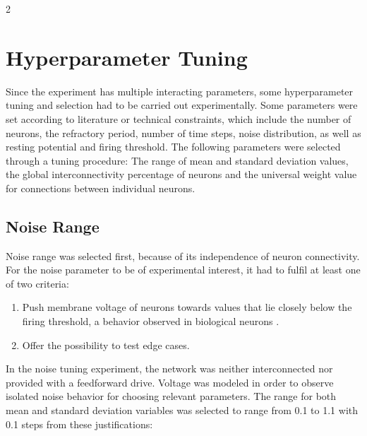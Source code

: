 \documentclass[12pt,a4paper]{article}
\begin{document}
\begin{multicols}{2}
        \section{Hyperparameter Tuning}
            Since the experiment has multiple interacting parameters, some hyperparameter tuning and selection had to be carried out experimentally. Some parameters were set according to literature or technical constraints, which include the number of neurons, the refractory period, number of time steps, noise distribution, as well as resting potential and firing threshold. The following parameters were selected through a tuning procedure: The range of mean and standard deviation values, the global interconnectivity percentage of neurons and the universal weight value for connections between individual neurons.
            
        \subsection{Noise Range} 
            Noise range was selected first, because of its independence of neuron connectivity. For the noise parameter to be of experimental interest, it had to fulfil at least one of two criteria: 
            \begin{enumerate}[label=(\arabic*), leftmargin=*, rightmargin=1em, itemsep=10pt, parsep=0pt, topsep=10pt, partopsep=0pt]
                \item\label{noise1} Push membrane voltage of neurons towards values that lie closely below the firing threshold, a behavior observed in biological neurons \cite{F}.
                \item\label{noise2} Offer the possibility to test edge cases.
            \end{enumerate}
            In the noise tuning experiment, the network was neither interconnected nor provided with a feedforward drive. Voltage was modeled in order to observe isolated noise behavior for choosing relevant parameters. The range for both mean and standard deviation variables was selected to range from 0.1 to 1.1 with 0.1 steps from these justifications:
            

\end{multicols}
\end{document}
